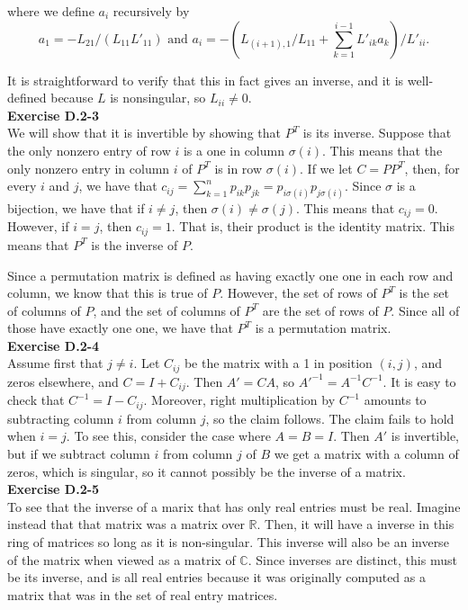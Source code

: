 \documentclass{article}
\begin{document}
where we define $a_i$ recursively by 
\[ a_1 = -L_{21}/(L_{11}L'_{11})  \mbox{ and } a_i = -\left(L_{(i+1),1}/L_{11} + \sum_{k=1}^{i-1} L'_{ik}a_k \right)/L'_{ii}.\]

It is straightforward to verify that this in fact gives an inverse, and it is well-defined because $L$ is nonsingular, so $L_{ii} \neq 0$.  \\

\noindent\textbf{Exercise D.2-3}\\
We will show that it is invertible by showing that $P^T$ is its inverse. Suppose that the only nonzero entry of row $i$ is a one in column $\sigma(i)$. This means that the only nonzero entry in column $i$ of $P^T$ is in row $\sigma(i)$. If we let $C = PP^T$, then, for every $i$ and $j$, we have that $c_{ij} = \sum_{k=1}^n p_{ik}p_{jk} =  p_{i\sigma(i)}p_{j\sigma(i)}$. Since $\sigma$ is a bijection, we have that if $i\neq j$, then $\sigma(i)\neq \sigma(j)$. This means that $c_{ij}=0$. However, if $i=j$, then $c_{ij} =1$. That is, their product is the identity matrix. This means that $P^T$ is the inverse of $P$. 

Since a permutation matrix is defined as having exactly one one in each row and column, we know that this is true of $P$. However, the set of rows of $P^T$ is the set of columns of $P$, and the set of columns of $P^T$ are the set of rows of $P$. Since all of those have exactly one one, we have that $P^T$ is a permutation matrix.\\

\noindent\textbf{Exercise D.2-4}\\

Assume first that $j\neq i$.  Let $C_{ij}$ be the matrix with a 1 in position $(i,j)$, and zeros elsewhere, and $C = I + C_{ij}$.  Then $A' = CA$, so $A'^{-1} = A^{-1}C^{-1}$.  It is easy to check that $C^{-1} = I-C_{ij}$.  Moreover, right multiplication by $C^{-1}$ amounts to subtracting column $i$ from column $j$, so the claim follows.  The claim fails to hold when $i=j$.  To see this, consider the case where $A = B = I$.  Then $A'$ is invertible, but if we subtract column $i$ from column $j$ of $B$ we get a matrix with a column of zeros, which is singular, so it cannot possibly be the inverse of a matrix.  \\

\noindent\textbf{Exercise D.2-5}\\

To see that the inverse of a marix that has only real entries must be real. Imagine instead that that matrix was a matrix over $\mathbb{R}$. Then, it will have a inverse in this ring of matrices so long as it is non-singular. This inverse will also be an inverse of the matrix when viewed as a matrix of $\mathbb{C}$. Since inverses are distinct, this must be its inverse, and is all real entries because it was originally computed as a matrix that was in the set of real entry matrices.
\end{document}
